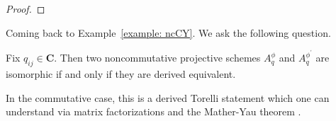\documentclass[dissertation.tex]{subfiles}
\begin{document}
\begin{proof}
\end{proof}

Coming back to Example~\ref{example: ncCY}. We ask the following question. 

\begin{question}
  Fix \(q_{ij} \in \mathbf{C}\). Then two noncommutative projective schemes \(A_q^\phi\) and \(A_q^{\phi^\prime}\) are isomorphic if and only if they are derived equivalent. 
\end{question}

In the commutative case, this is a derived Torelli statement which one can understand via matrix factorizations \cite{OrlovMF} and the Mather-Yau theorem \cite{MatherYau}.  

%
%
\end{document}
